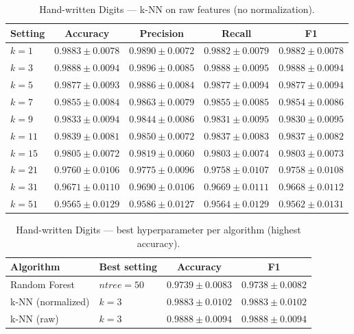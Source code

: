 \documentclass{article}
\begin{document}
\begin{table}[H]
\centering
\small
\caption{Hand-written Digits --- k-NN on raw features (no normalization).}
\label{tab:digits-knn-raw}
\begin{tabular}{@{}lcccc@{}}
\toprule
Setting & Accuracy & Precision & Recall & F1 \\
\midrule
$k=1$  & $0.9883 \pm 0.0078$ & $0.9890 \pm 0.0072$ & $0.9882 \pm 0.0079$ & $0.9882 \pm 0.0078$ \\
$k=3$  & $\mathbf{0.9888 \pm 0.0094}$ & $\mathbf{0.9896 \pm 0.0085}$ & $\mathbf{0.9888 \pm 0.0095}$ & $\mathbf{0.9888 \pm 0.0094}$ \\
$k=5$  & $0.9877 \pm 0.0093$ & $0.9886 \pm 0.0084$ & $0.9877 \pm 0.0094$ & $0.9877 \pm 0.0094$ \\
$k=7$  & $0.9855 \pm 0.0084$ & $0.9863 \pm 0.0079$ & $0.9855 \pm 0.0085$ & $0.9854 \pm 0.0086$ \\
$k=9$  & $0.9833 \pm 0.0094$ & $0.9844 \pm 0.0086$ & $0.9831 \pm 0.0095$ & $0.9830 \pm 0.0095$ \\
$k=11$ & $0.9839 \pm 0.0081$ & $0.9850 \pm 0.0072$ & $0.9837 \pm 0.0083$ & $0.9837 \pm 0.0082$ \\
$k=15$ & $0.9805 \pm 0.0072$ & $0.9819 \pm 0.0060$ & $0.9803 \pm 0.0074$ & $0.9803 \pm 0.0073$ \\
$k=21$ & $0.9760 \pm 0.0106$ & $0.9775 \pm 0.0096$ & $0.9758 \pm 0.0107$ & $0.9758 \pm 0.0108$ \\
$k=31$ & $0.9671 \pm 0.0110$ & $0.9690 \pm 0.0106$ & $0.9669 \pm 0.0111$ & $0.9668 \pm 0.0112$ \\
$k=51$ & $0.9565 \pm 0.0129$ & $0.9586 \pm 0.0127$ & $0.9564 \pm 0.0129$ & $0.9562 \pm 0.0131$ \\
\bottomrule
\end{tabular}
\end{table}

\begin{table}[H]
\centering
\small
\caption{Hand-written Digits --- best hyperparameter per algorithm (highest accuracy).}
\label{tab:digits-headline}
\begin{tabular}{@{}llcc@{}}
\toprule
Algorithm & Best setting & Accuracy & F1 \\
\midrule
Random Forest          & $\mathit{ntree}=50$       & $0.9739 \pm 0.0083$ & $0.9738 \pm 0.0082$ \\
k-NN (normalized)      & $k=3$                     & $0.9883 \pm 0.0102$ & $0.9883 \pm 0.0102$ \\
k-NN (raw)             & $k=3$                     & $\mathbf{0.9888 \pm 0.0094}$ & $\mathbf{0.9888 \pm 0.0094}$ \\
\bottomrule
\end{tabular}
\end{table}
\end{document}
